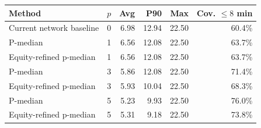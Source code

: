 \begin{tabular}{lrrrrr}
\hline
Method & $p$ & Avg & P90 & Max & Cov. $\leq 8$ min\\
\hline
Current network baseline & 0 & 6.98 & 12.94 & 22.50 & 60.4\%\\
P-median & 1 & 6.56 & 12.08 & 22.50 & 63.7\%\\
Equity-refined p-median & 1 & 6.56 & 12.08 & 22.50 & 63.7\%\\
P-median & 3 & 5.86 & 12.08 & 22.50 & 71.4\%\\
Equity-refined p-median & 3 & 5.93 & 10.04 & 22.50 & 68.3\%\\
P-median & 5 & 5.23 & 9.93 & 22.50 & 76.0\%\\
Equity-refined p-median & 5 & 5.31 & 9.18 & 22.50 & 73.8\%\\
\hline
\end{tabular}

